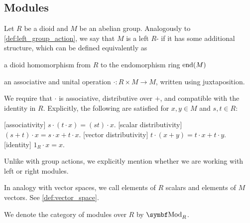 \subsection{Modules}\label{subsec:modules}

\begin{definition}\label{def:left_module}
  Let \( R \) be a dioid and \( M \) be an abelian group. Analogously to \cref{def:left_group_action}, we say that \( M \) is a left \( R \)- if it has some additional structure, which can be defined equivalently as
  \begin{defenum}
     a dioid homomorphism from \( R \) to the endomorphism ring \( \operatorname{end}(M) \)

    \cite[374]{Knapp2016BAlg} an associative  and unital operation \( \cdot: R \times M \to M \), written using juxtaposition.

    We require that \( \cdot \) is associative, distributive over \( + \), and compatible with the identity in \( R \). Explicitly, the following are satisfied for \( x, y \in M \) and \( s, t \in R \):
    \begin{description}
      [associativity] \( s \cdot (t \cdot x) = (s t) \cdot x \).
      [scalar distributivity] \( (s + t) \cdot x = s \cdot x + t \cdot x \).
      [vector distributivity] \( t \cdot (x + y) = t \cdot x + t \cdot y \).
      [identity] \( 1_R \cdot x = x \).
    \end{description}
  \end{defenum}

  Unlike with group actions, we explicitly mention whether we are working with left or right modules.

  In analogy with vector spaces, we call elements of \( R \) scalars and elements of \( M \) vectors. See \cref{def:vector_space}.

  We denote the category of modules over \( R \) by \( \Cat{Mod}_R \).
\end{definition}
